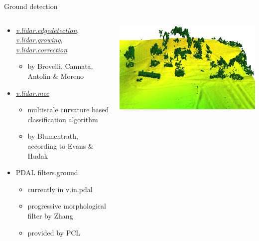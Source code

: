 \documentclass[xcolor={dvipsnames,usenames},beamer,aspectratio=169]{beamer}
\newcommand{\gmodule}[1]{\href{http://grass.osgeo.org/grass71/manuals/#1.html}{\emph{#1}}}
\newcommand{\amodule}[1]{\href{http://grass.osgeo.org/grass70/manuals/addons/#1.html}{\emph{#1}}}
\begin{document}
\begin{frame}{Ground detection}

\begin{columns}
\begin{column}{0.35\textwidth}

\begin{itemize}
\item \gmodule{v.lidar.edgedetection}, \gmodule{v.lidar.growing}, \gmodule{v.lidar.correction}
\begin{itemize}
  \item \tiny by Brovelli, Cannata, Antolin \& Moreno
\end{itemize}

\item \amodule{v.lidar.mcc}
\begin{itemize}
  \item \tiny multiscale curvature based classification algorithm
  \item \tiny by Blumentrath, according to Evans \& Hudak
\end{itemize}

\item PDAL filters.ground
\begin{itemize}
  \item \tiny currently in v.in.pdal
  \item \tiny progressive morphological filter by Zhang
  \item \tiny provided by PCL
\end{itemize}

\end{itemize}

\end{column}
\begin{column}{0.64\textwidth}

\begin{center}
  \includegraphics[width=\textwidth]{grass/mcc_default_smaller}
\end{center}

\end{column}
\end{columns}

\end{frame}
\end{document}
